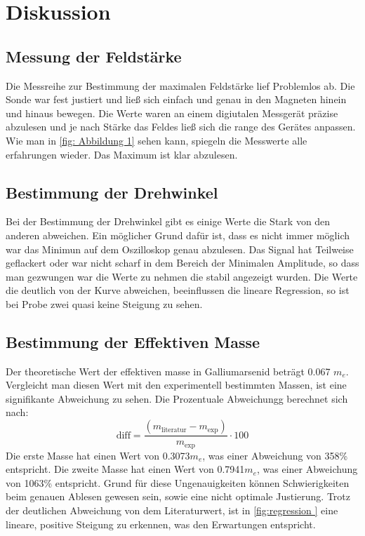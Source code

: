 \section{Diskussion}
\label{sec:Diskussion}

\subsection{Messung der Feldstärke}
Die Messreihe zur Bestimmung der maximalen Feldstärke lief Problemlos ab. Die Sonde war fest 
justiert und ließ sich einfach und genau in den Magneten hinein und hinaus bewegen. Die Werte waren 
an einem digiutalen Messgerät präzise abzulesen und je nach Stärke das Feldes ließ sich die range des 
Gerätes anpassen. Wie man in \ref{fig: Abbildung 1} sehen kann, spiegeln die Messwerte alle erfahrungen wieder.
Das Maximum ist klar abzulesen.

\subsection{Bestimmung der Drehwinkel}
Bei der Bestimmung der Drehwinkel gibt es einige Werte die Stark von den anderen abweichen. Ein möglicher 
Grund dafür ist, dass es nicht immer möglich war das Minimun auf dem Oszilloskop genau abzulesen. Das Signal 
hat Teilweise geflackert oder war nicht scharf in dem Bereich der Minimalen Amplitude, so dass man gezwungen war die Werte 
zu nehmen die stabil angezeigt wurden. Die Werte die deutlich von der Kurve abweichen, beeinflussen die lineare Regression,
so ist bei Probe zwei quasi keine Steigung zu sehen.

\subsection{Bestimmung der Effektiven Masse}
Der theoretische Wert der effektiven masse in Galliumarsenid beträgt 0.067 $m_e$. Vergleicht man diesen Wert mit den
experimentell bestimmten Massen, ist eine signifikante Abweichung zu sehen. Die Prozentuale Abweichungg berechnet sich nach:
\begin{equation} 
    \text{diff} = \frac{(m_{\text{literatur}} - m_{\text{exp}})}{m_{\text{exp}}} \cdot 100 
\end{equation}
Die erste Masse hat einen Wert von 0.3073$m_e$, was einer Abweichung von 358\% entspricht.
Die zweite Masse hat einen Wert von 0.7941$m_e$, was einer Abweichung von 1063\% entspricht.
Grund für diese Ungenauigkeiten können Schwierigkeiten beim genauen Ablesen gewesen sein, sowie 
eine nicht optimale Justierung. Trotz der deutlichen Abweichung von dem Literaturwert, ist
in \ref{fig:regression } eine lineare, positive Steigung zu erkennen, was den Erwartungen entspricht.




